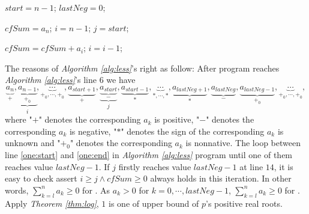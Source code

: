 \begin{algorithm}
	\caption{\less \label{alg:less}}
	\DontPrintSemicolon
	
	$start=n-1$;
	$lastNeg=0$;\;
	
	
	$cfSum=a_n$;
	$i=n-1$;
	$j=start$;\;
	{
		{
			
			$cfSum=cfSum+a_i$;
			$i=i-1$;\;
			
		}
}

\end{algorithm}
The reasons of {\em Algorithm \ref{alg:less}}'s right as follow:
 After program reaches {\em Algorithm \ref{alg:less}}'s line $6$ we have \[\underbrace{a_n}_{+},\underbrace{\underbrace{a_{n-1}}_{+_0}}_{i},\underbrace{\cdots}_{+_0,\cdots,+_0},\underbrace{a_{start+1}}_{+},\underbrace{\underbrace{a_{start}}_{-}}_{j},\underbrace{a_{start-1}}_{*},\underbrace{\cdots}_{*,\cdots,*},\underbrace{a_{lastNeg+1}}_{*},\underbrace{a_{lastNeg}}_{-},\underbrace{a_{lastNeg-1}}_{+_0},\underbrace{\cdots}_{+_0,\cdots,+_0},\]
where "$+$" denotes the corresponding $a_k$ is positive, "$-$" denotes the corresponding $a_k$ is negative, "$*$" denotes the sign of the
corresponding $a_k$ is unknown and  "$+_0$" denotes the corresponding $a_k$ is nonnative.
The loop between line \ref{one:start} and \ref{one:end}  in {\em Algorithm \ref{alg:less}} program   until one of them reaches value $lastNeg-1$. If $j$ firstly  reaches value $lastNeg-1$ at line $14$,  it is easy to check assert $i\ge j\wedge cfSum\ge 0$ always holds in this iteration. In other words, $\sum_{k=l}^na_k\ge 0$ for . As $a_{k}>0$ for $k=0,\cdots, lastNeg-1$, $\sum_{k=l}^na_k\ge 0$ for . Apply {\em Theorem  \ref{thm:log}},  $1$ is one of upper bound  of $p$'s positive real roots.


